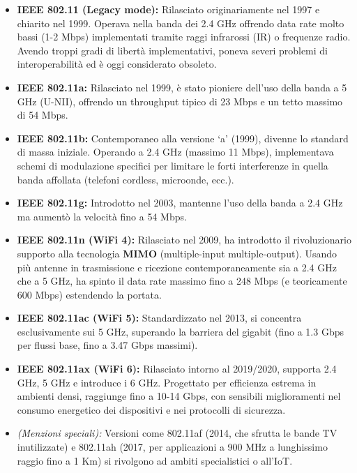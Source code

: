\documentclass[
  italian,
  openany]{book}
\begin{document}
\begin{itemize}
\item
  \textbf{IEEE 802.11 (Legacy mode):} Rilasciato originariamente nel
  1997 e chiarito nel 1999. Operava nella banda dei 2.4 GHz offrendo
  data rate molto bassi (1-2 Mbps) implementati tramite raggi infrarossi
  (IR) o frequenze radio. Avendo troppi gradi di libertà implementativi,
  poneva severi problemi di interoperabilità ed è oggi considerato
  obsoleto.
\item
  \textbf{IEEE 802.11a:} Rilasciato nel 1999, è stato pioniere dell'uso
  della banda a 5 GHz (U-NII), offrendo un throughput tipico di 23 Mbps
  e un tetto massimo di 54 Mbps.
\item
  \textbf{IEEE 802.11b:} Contemporaneo alla versione `a' (1999), divenne
  lo standard di massa iniziale. Operando a 2.4 GHz (massimo 11 Mbps),
  implementava schemi di modulazione specifici per limitare le forti
  interferenze in quella banda affollata (telefoni cordless, microonde,
  ecc.).
\item
  \textbf{IEEE 802.11g:} Introdotto nel 2003, mantenne l'uso della banda
  a 2.4 GHz ma aumentò la velocità fino a 54 Mbps.
\item
  \textbf{IEEE 802.11n (WiFi 4):} Rilasciato nel 2009, ha introdotto il
  rivoluzionario supporto alla tecnologia \textbf{MIMO} (multiple-input
  multiple-output). Usando più antenne in trasmissione e ricezione
  contemporaneamente sia a 2.4 GHz che a 5 GHz, ha spinto il data rate
  massimo fino a 248 Mbps (e teoricamente 600 Mbps) estendendo la
  portata.
\item
  \textbf{IEEE 802.11ac (WiFi 5):} Standardizzato nel 2013, si concentra
  esclusivamente sui 5 GHz, superando la barriera del gigabit (fino a
  1.3 Gbps per flussi base, fino a 3.47 Gbps massimi).
\item
  \textbf{IEEE 802.11ax (WiFi 6):} Rilasciato intorno al 2019/2020,
  supporta 2.4 GHz, 5 GHz e introduce i 6 GHz. Progettato per efficienza
  estrema in ambienti densi, raggiunge fino a 10-14 Gbps, con sensibili
  miglioramenti nel consumo energetico dei dispositivi e nei protocolli
  di sicurezza.
\item
  \emph{(Menzioni speciali):} Versioni come 802.11af (2014, che sfrutta
  le bande TV inutilizzate) e 802.11ah (2017, per applicazioni a 900 MHz
  a lunghissimo raggio fino a 1 Km) si rivolgono ad ambiti specialistici
  o all'IoT.
\end{itemize}
\end{document}
